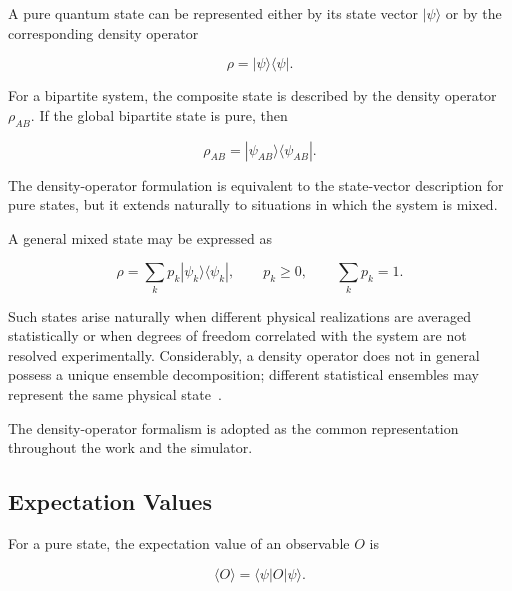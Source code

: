 A pure quantum state can be represented either by its state vector
\( |\psi\rangle \) or by the corresponding density operator

\begin{equation}
\rho
=
|\psi\rangle\langle\psi|.
\label{eq:pure_state_density_operator}
\end{equation}

For a bipartite system, the composite state is described by the density operator
\(\rho_{AB}\). If the global bipartite state is pure, then

\begin{equation}
\rho_{AB}
=
|\psi_{AB}\rangle\langle\psi_{AB}|.
\label{eq:pure_bipartite_density_operator}
\end{equation}

The density-operator formulation is equivalent to the state-vector description
for pure states, but it extends naturally to situations in which the system is
mixed.

A general mixed state may be expressed as

\begin{equation}
\rho
=
\sum_k p_k
|\psi_k\rangle\langle\psi_k|,
\qquad
p_k\geq0,
\qquad
\sum_k p_k=1.
\label{eq:mixed_state_convex_decomposition}
\end{equation}

Such states arise naturally when different physical realizations are averaged
statistically or when degrees of freedom correlated with the system are not
resolved experimentally. 
Considerably, a density operator does not in general
possess a unique ensemble decomposition; different statistical ensembles may
represent the same physical state~\cite{nielsen_chuang_qcqi}.

The density-operator formalism is adopted as the common representation
throughout the work and the simulator.


\subsection{Expectation Values}
\label{subsec:expectation_values}

For a pure state, the expectation value of an observable \(O\) is

\begin{equation}
\langle O\rangle
=
\langle\psi|O|\psi\rangle.
\label{eq:ket_expectation_value}
\end{equation}

